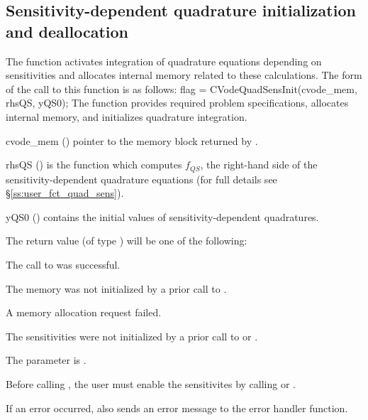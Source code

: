 
\subsection{Sensitivity-dependent quadrature initialization and deallocation}%
\label{ss:quad_sens_init}

The function  activates integration of quadrature equations depending
on sensitivities and allocates internal memory related to these calculations.
The form of the call to this function is as follows:
{
flag = CVodeQuadSensInit(cvode\_mem, rhsQS, yQS0);
}
{
  The function  provides required problem specifications,
  allocates internal memory, and initializes quadrature integration.
}
{
  \begin{args}
  \item[cvode\_mem] ()
    pointer to the {\cvodes} memory block returned by .
  \item[rhsQS] ()
    is the {\C} function which computes $f_{QS}$, the right-hand side of the 
    sensitivity-dependent quadrature equations
    (for full details see \S\ref{ss:user_fct_quad_sens}).
  \item[yQS0] ()
    contains the initial values of sensitivity-dependent quadratures.
  \end{args}
}
{
  The return value  (of type ) will be one of the following:
  \begin{args}
  \item[\Id{CV\_SUCCESS}]
    The call to  was successful.
  \item[\Id{CVODE\_MEM\_NULL}] 
    The {\cvodes} memory was not initialized by a prior call to .
  \item[\Id{CVODE\_MEM\_FAIL}] 
    A memory allocation request failed.
  \item[\Id{CV\_NO\_SENS}] 
    The sensitivities were not initialized by a prior call to  or .
  \item[\Id{CV\_ILL\_INPUT}]
    The parameter  is .
  \end{args}
}
{
 
 {\warn} Before calling , the user must enable the sensitivites
  by calling  or .

  If an error occurred,  also sends an error message to the
  error handler function.
}
